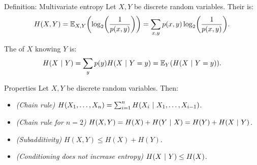 \documentclass[a4paper]{article}
\begin{document}
\begin{parag}{Definition: Multivariate entropy}
    Let $X, Y$ be discrete random variables. Their  is: 
    \[H\left(X, Y\right) = \exval_{X, Y}\left(\log_2\left(\frac{1}{p\left(x, y\right)}\right)\right) = \sum_{x, y} p\left(x, y\right)\log_2\left(\frac{1}{p\left(x, y\right)}\right).\]

    The  of $X$ knowing $Y$ is: 
    \[H\left(X \suchthat Y\right) = \sum_{y} p\left(y\right) H\left(X \suchthat Y = y\right) = \exval_Y\left(H\left(X \suchthat Y = y\right)\right).\]

    \begin{subparag}{Properties}
        Let $X, Y$ be discrete random variables. Then:
        \begin{itemize}
            \item \textit{(Chain rule)} $H\left(X_1, \ldots, X_n\right) = \sum_{i=1}^{n} H\left(X_i \suchthat X_1, \ldots, X_{i-1}\right) $.
            \item \textit{(Chain rule for $n = 2$)} $H\left(X, Y\right) = H\left(X\right) + H\left(Y \suchthat X\right) = H\left(Y\right) + H\left(X \suchthat Y\right)$.
            \item \textit{(Subadditivity)} $H\left(X, Y\right) \leq H\left(X\right) + H\left(Y\right)$.
            \item \textit{(Conditioning does not increase entropy)} $H\left(X \suchthat Y\right) \leq H\left(X\right)$.
        \end{itemize}
    \end{subparag}
\end{parag}
\end{document}
